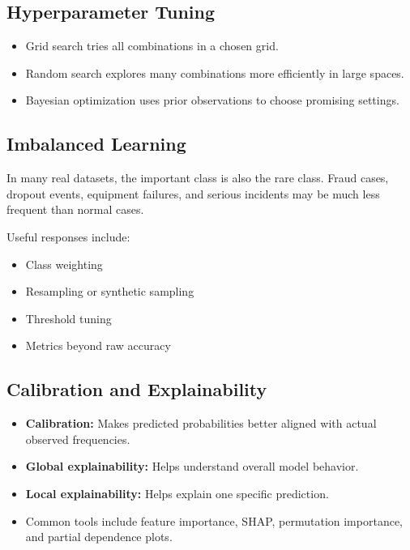 \documentclass[11pt,a4paper]{article}
\begin{document}
\subsection{Hyperparameter Tuning}

\begin{itemize}[leftmargin=*]
  \item Grid search tries all combinations in a chosen grid.
  \item Random search explores many combinations more efficiently in large spaces.
  \item Bayesian optimization uses prior observations to choose promising settings.
\end{itemize}

\subsection{Imbalanced Learning}

\begin{conceptbox}
In many real datasets, the important class is also the rare class. Fraud cases, dropout events, equipment failures, and serious incidents may be much less frequent than normal cases.
\end{conceptbox}

Useful responses include:
\begin{itemize}[leftmargin=*]
  \item Class weighting
  \item Resampling or synthetic sampling
  \item Threshold tuning
  \item Metrics beyond raw accuracy
\end{itemize}

\subsection{Calibration and Explainability}

\begin{itemize}[leftmargin=*]
  \item \textbf{Calibration:} Makes predicted probabilities better aligned with actual observed frequencies.
  \item \textbf{Global explainability:} Helps understand overall model behavior.
  \item \textbf{Local explainability:} Helps explain one specific prediction.
  \item Common tools include feature importance, SHAP, permutation importance, and partial dependence plots.
\end{itemize}
\end{document}
